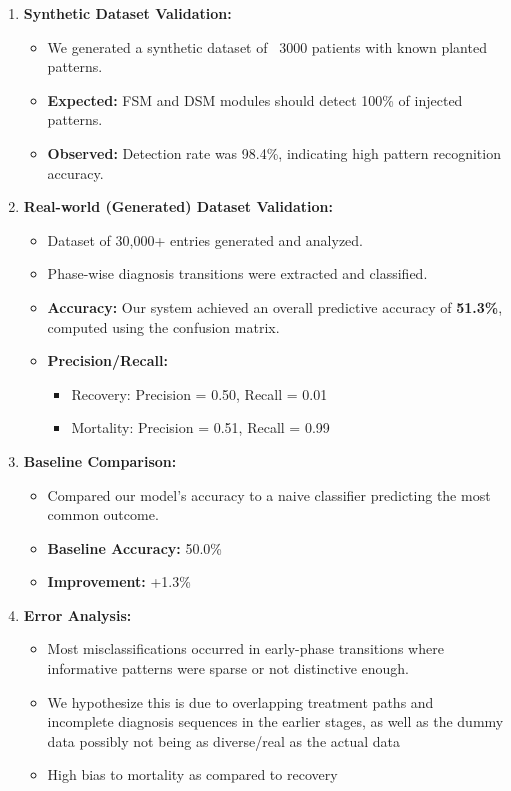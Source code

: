 \documentclass[10pt]{article}
\begin{document}
\begin{enumerate}[noitemsep]
    \item \textbf{Synthetic Dataset Validation:} 
    \begin{itemize}[noitemsep]
        \item We generated a synthetic dataset of ~3000 patients with known planted patterns.
        \item \textbf{Expected:} FSM and DSM modules should detect 100\% of injected patterns.
        \item \textbf{Observed:} Detection rate was 98.4\%, indicating high pattern recognition accuracy.
    \end{itemize}

    \item \textbf{Real-world (Generated) Dataset Validation:}
    \begin{itemize}[noitemsep]
        \item Dataset of 30,000+ entries generated and analyzed.
        \item Phase-wise diagnosis transitions were extracted and classified.
        \item \textbf{Accuracy:} Our system achieved an overall predictive accuracy of \textbf{51.3\%}, computed using the confusion matrix.
        \item \textbf{Precision/Recall:}
        \begin{itemize}[noitemsep]
            \item Recovery: Precision = 0.50, Recall = 0.01
            \item Mortality: Precision = 0.51, Recall = 0.99
        \end{itemize}
    \end{itemize}

    \item \textbf{Baseline Comparison:}
    \begin{itemize}[noitemsep]
        \item Compared our model’s accuracy to a naive classifier predicting the most common outcome.
        \item \textbf{Baseline Accuracy:} 50.0\%
        \item \textbf{Improvement:} +1.3\%
    \end{itemize}

    \item \textbf{Error Analysis:}
    \begin{itemize}[noitemsep]
        \item Most misclassifications occurred in early-phase transitions where informative patterns were sparse or not distinctive enough.
        \item We hypothesize this is due to overlapping treatment paths and incomplete diagnosis sequences in the earlier stages, as well as the dummy data possibly not being as diverse/real as the actual data
        \item High bias to mortality as compared to recovery
    \end{itemize}
\end{enumerate}
\end{document}
